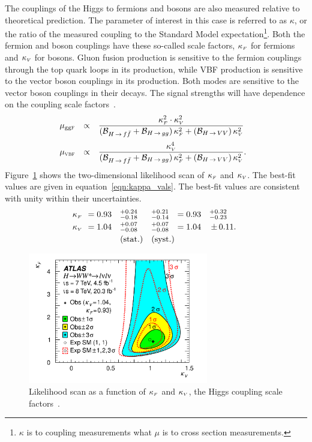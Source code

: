 The couplings of the Higgs to fermions and bosons are also measured relative to theoretical prediction. The parameter of interest in this case is referred to as $\kappa$, or the ratio of the measured coupling to the Standard Model expectation\footnote{$\kappa$ is to coupling measurements what $\mu$ is to cross section measurements.}. Both the fermion and boson couplings have these so-called scale factors, $\kappa_{\mbox{\tiny $F$}}$ for fermions and $\kappa_{\mbox{\tiny $V$}}$ for bosons. Gluon fusion production is sensitive to the fermion couplings through the top quark loops in its production, while VBF production is sensitive to the vector boson couplings in its production. Both modes are sensitive to the vector boson couplings in their decays. The signal strengths will have dependence on the coupling scale factors~\cite{LHCXSWG}. 
%
\begin{equation}
\np%
\begin{array}{lc l}
  \mu_{\scggF} &\propto &{\displaystyle\frac{\kF^2 \cdot \kV^2}{(\BF_{\Hff}+\BF_{\Hgg})\,\kF^2+(\BF_{\HVV})\,\kV^2}}\\ \clineskip\clineskip
  \mu_{\scVBF} &\propto &{\displaystyle\frac{\kV^4            }{(\BF_{\Hff}+\BF_{\Hgg})\,\kF^2+(\BF_{\HVV})\,\kV^2}} . 
\end{array}
\label{eqn:kappas}
\end{equation}
%
Figure~\ref{fig:kappas} shows the two-dimensional likelihood scan of $\kappa_{\mbox{\tiny $F$}}$ and $\kappa_{\mbox{\tiny $V$}}$. The best-fit values are given in equation~\ref{eqn:kappa_vals}. The best-fit values are consistent with unity within their uncertainties. 
%
\begin{equation}
\begin{array}{llllll}
\no\kF\no&=0.93\no&\,\,^{+0.24}_{-0.18}\np&^{+0.21}_{-0.14}\np&=0.93&^{+0.32}_{-0.23} \\ \clineskip
\no\kV\no&=1.04\no&\,\,^{+0.07}_{-0.08}\np&^{+0.07}_{-0.08}\np&=1.04&{\PM}0.11.\\ \clineskip
                     &        & ~\textrm{(stat.)}     &\textrm{(syst.)}\np
\end{array}
\label{eqn:kappa_vals}
\end{equation}
%
\begin{figure}[h!]
  \centering
  \captionsetup{justification=centering}

  \includegraphics[width=0.7\textwidth]{figures/kappas}
  \caption{Likelihood scan as a function of $\kappa_{\mbox{\tiny $F$}}$ and $\kappa_{\mbox{\tiny $V$}}$, the Higgs coupling scale factors~\cite{WW2015}.}
  \label{fig:kappas}
\end{figure}

